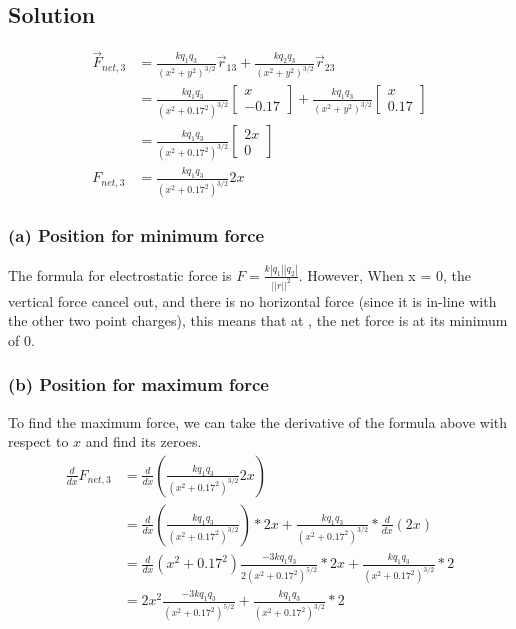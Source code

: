 \documentclass[12pt]{article}
\begin{document}
\subsection*{Solution}
\begin{align*}
    \vec{F}_{net,3} &=  \frac{k q_1 q_3}{(x^2 + y^2)^{3/2}}\vec{r}_{13} + \frac{k q_2 q_3}{(x^2 + y^2)^{3/2}}\vec{r}_{23}\\
        &=  \frac{k q_1 q_3}{(x^2 + 0.17^2)^{3/2}}\begin{bmatrix} x \\ -0.17 \end{bmatrix} + \frac{k q_1 q_3}{(x^2 + y^2)^{3/2}}\begin{bmatrix} x \\ 0.17 \end{bmatrix}\\
        &=  \frac{k q_1 q_3}{(x^2 + 0.17^2)^{3/2}}\begin{bmatrix} 2x \\ 0 \end{bmatrix}\\
    F_{net,3}   &=  \frac{k q_1 q_3}{(x^2 + 0.17^2)^{3/2}}2x
\end{align*}

\subsubsection*{(a) Position for minimum force}
The formula for electrostatic force is $F = \frac{k |q_1| |q_2|}{||r||^2}$. However, When x = 0, the vertical force cancel out, and there is no horizontal force (since it is in-line with the other two point charges), this means that at , the net force is at its minimum of 0.

\subsubsection*{(b) Position for maximum force}
To find the maximum force, we can take the derivative of the formula above with respect to $x$ and find its zeroes.
\begin{align*}
    \frac{d}{dx}F_{net,3}   &=  \frac{d}{dx}\left(\frac{k q_1 q_3}{(x^2 + 0.17^2)^{3/2}}2x\right)\\
        &=  \frac{d}{dx}\left( \frac{k q_1 q_3}{(x^2 + 0.17^2)^{3/2}} \right) * 2x + \frac{k q_1 q_3}{(x^2 + 0.17^2)^{3/2}} * \frac{d}{dx}\left( 2x \right)\\
        &=  \frac{d}{dx}\left( x^2 + 0.17^2 \right) \frac{-3 k q_1 q_3}{2(x^2 + 0.17^2)^{5/2}} * 2x + \frac{k q_1 q_3}{(x^2 + 0.17^2)^{3/2}} * 2\\
        &=  2x^2 \frac{-3 k q_1 q_3}{(x^2 + 0.17^2)^{5/2}} + \frac{k q_1 q_3}{(x^2 + 0.17^2)^{3/2}} * 2
\end{align*}
\end{document}
